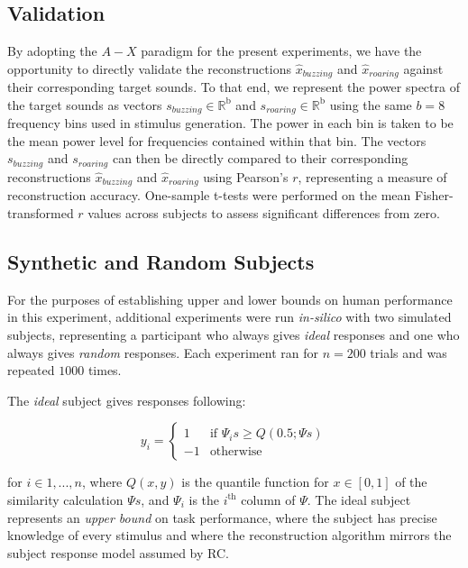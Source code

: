 \documentclass[journal]{IEEEtran}
\begin{document}
\subsection{Validation}

By adopting the $A-X$ paradigm for the present experiments,
we have the opportunity to directly validate the reconstructions
$\hat{x}_{buzzing}$ and $\hat{x}_{roaring}$ against their corresponding target sounds.
To that end, we represent the power spectra of the target sounds as vectors $s_{buzzing} \in \mathbb{R}^\mathrm{b}$ and $s_{roaring} \in \mathbb{R}^\mathrm{b}$ using the same $b=8$ frequency bins used in stimulus generation.
The power in each bin is taken to be the mean power level for frequencies contained within that bin.
The vectors $s_{buzzing}$ and $s_{roaring}$ can then be directly compared to their corresponding reconstructions
$\hat{x}_{buzzing}$ and $\hat{x}_{roaring}$ using Pearson's $r$, representing a measure of reconstruction accuracy.
One-sample t-tests were performed on the mean Fisher-transformed $r$ values across subjects to assess significant differences from zero.

\subsection{Synthetic and Random Subjects}

For the purposes of establishing upper and lower bounds on human performance in this experiment,
additional experiments were run \textit{in-silico} with two simulated subjects,
representing a participant who always gives \textit{ideal} responses and one who always gives \textit{random} responses.
Each experiment ran for $n=200$ trials and was repeated $1000$ times.

The \textit{ideal} subject gives responses following:

\begin{equation}
    y_i =
        \begin{cases}
            1 & \text{if } \Psi_i s \geq Q(0.5; \Psi s) \\
            -1 & \text{otherwise}
        \end{cases}
\end{equation}

for $i \in 1, ..., n$, where $Q(x, y)$ is the quantile function for $x \in [0, 1]$ of the similarity calculation $\Psi s$, and
$\Psi_i$ is the $i^\mathrm{th}$ column of $\Psi$.
The ideal subject represents an \textit{upper bound} on task performance,
where the subject has precise knowledge of every stimulus and where the reconstruction algorithm mirrors the subject response model assumed by RC.
\end{document}

